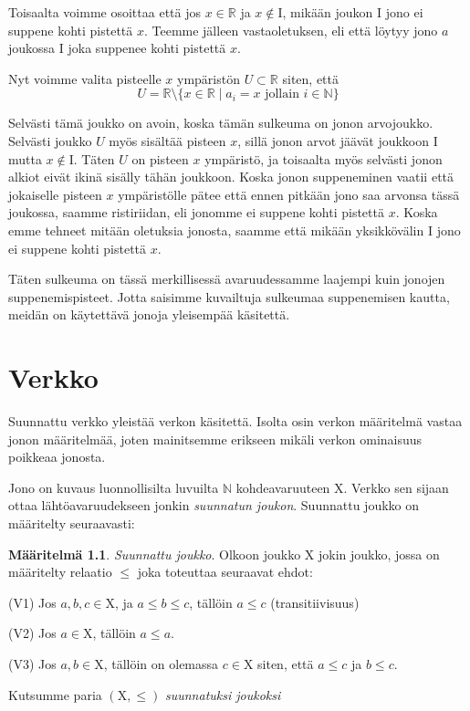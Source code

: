 \documentclass[12pt,a4paper,leqno]{report}
\newcommand{\R}{\mathbb{R}}
\newcommand{\N}{\mathbb{N}}
\newcommand{\X}{\mathrm{X}}
\newcommand{\I}{\mathrm{I}}
\newcommand{\verkop}{\leq}
\theoremstyle{plain}
\theoremstyle{definition}
\newtheorem{maar}[equation]{Määritelmä}
\theoremstyle{remark}
\begin{document}
Toisaalta voimme osoittaa että jos $x \in \R$ ja $x \not\in \I$, mikään joukon $\I$ jono ei suppene kohti pistettä $x$. Teemme jälleen vastaoletuksen, eli että löytyy jono $a$ joukossa $\I$ joka suppenee kohti pistettä $x$.

Nyt voimme valita pisteelle $x$ ympäristön $U \subset \R$ siten, että
\begin{equation}
U = \R \setminus \{x \in \R \mid a_i = x \text{ jollain } i \in \N \}
\end{equation}

Selvästi tämä joukko on avoin, koska tämän sulkeuma on jonon arvojoukko. Selvästi joukko $U$ myös sisältää pisteen $x$, sillä jonon arvot jäävät joukkoon $\I$ mutta $x \not\in \I$. Täten $U$ on pisteen $x$ ympäristö, ja toisaalta myös selvästi jonon alkiot eivät ikinä sisälly tähän joukkoon. Koska jonon suppeneminen vaatii että jokaiselle pisteen $x$ ympäristölle pätee että ennen pitkään jono saa arvonsa tässä joukossa, saamme ristiriidan, eli jonomme ei suppene kohti pistettä $x$. Koska emme tehneet mitään oletuksia jonosta, saamme että mikään yksikkövälin $\I$ jono ei suppene kohti pistettä $x$.

Täten sulkeuma on tässä merkillisessä avaruudessamme laajempi kuin jonojen suppenemispisteet. Jotta saisimme kuvailtuja sulkeumaa suppenemisen kautta, meidän on käytettävä jonoja yleisempää käsitettä.

\chapter{Verkko}

Suunnattu verkko yleistää verkon käsitettä. Isolta osin verkon määritelmä vastaa jonon määritelmää, joten mainitsemme erikseen mikäli verkon ominaisuus poikkeaa jonosta.

Jono on kuvaus luonnollisilta luvuilta $\N$ kohdeavaruuteen $\X$. Verkko sen sijaan ottaa lähtöavaruudekseen jonkin \emph{suunnatun joukon}. Suunnattu joukko on määritelty seuraavasti:

\begin{maar}\label{suunjoukmaar}
\emph{Suunnattu joukko}. Olkoon joukko $\X$ jokin joukko, jossa on määritelty relaatio $\verkop$ joka toteuttaa seuraavat ehdot:

(V1) Jos $a, b, c \in \X$, ja $a \verkop b \verkop c$, tällöin $a \verkop c$ (transitiivisuus)

(V2) Jos $a \in \X$, tällöin $a \verkop a$.

(V3) Jos $a, b \in \X$, tällöin on olemassa $c \in \X$ siten, että $a \verkop c$ ja $b \verkop c$.

Kutsumme paria $(\X, \verkop)$ \emph{suunnatuksi joukoksi}
\end{maar}
\end{document}
